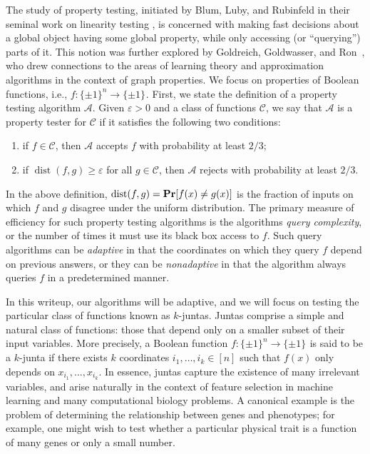 \documentclass[10pt,a4paper]{article}
\newcommand{\say}[1]{``#1''}
\theoremstyle{plain}
\theoremstyle{remark}
\theoremstyle{plain}
\renewcommand{\Pr}{\mathop{\bf Pr\/}}
\newcommand{\calA}{\mathcal{A}}
\newcommand{\calC}{\mathcal{C}}
\newcommand{\dist}{\operatorname{dist}}
\newcommand{\BooleanHypercube}[1]{\{\pm 1\}^{#1}}
\renewcommand{\epsilon}{\varepsilon}
\begin{document}
The study of property testing, initiated by Blum, Luby, and Rubinfeld in their seminal work on linearity testing \cite{DBLP:conf/stoc/BlumLR90}, is concerned with making fast decisions about a global object having some global property, while only accessing (or \say{querying}) parts of it. This notion was further explored by Goldreich, Goldwasser, and Ron~\cite{DBLP:conf/focs/GoldreichGR96}, who drew connections to the areas of learning theory and approximation algorithms in the context of graph properties.
We focus on properties of Boolean functions, i.e.,  $f:\BooleanHypercube{n} \to \BooleanHypercube{}$.
First, we state the definition of a property testing algorithm $\calA$. Given $\epsilon > 0$ and a class of functions $\calC$, we say that $\calA$ is a property tester for $\calC$ if it satisfies the following two conditions: 
\begin{enumerate}
    \item if $f \in \calC$, then $\calA$ accepts $f$ with probability at least $2/3$;
    \item if $\dist(f,g) \geq \epsilon$ for all $g \in \calC$, then $\calA$ rejects with probability at least $2/3$. 
\end{enumerate}
In the above definition, $\dist(f,g) = \Pr[f(x) \neq g(x)]$ is the fraction of inputs on which $f$ and $g$ disagree under the uniform distribution. The primary measure of efficiency for such property testing algorithms is the algorithms \textit{query complexity}, or the number of times it must use its black box access to $f$. Such query algorithms can be \textit{adaptive} in that the coordinates on which they query $f$ depend on previous answers, or they can be \textit{nonadaptive} in that the algorithm always queries $f$ in a predetermined manner. 

%
In this writeup, our algorithms will be adaptive, and we will focus on testing the particular class of functions known as $k$-juntas. Juntas comprise a simple and natural class of functions: those that depend only on a smaller subset of their input variables. More precisely, a  Boolean function $f: \BooleanHypercube{n} \to \BooleanHypercube{}$ is said to be a $k$-junta if there exists $k$ coordinates $i_1,\ldots,i_k\in [n]$ such that $f(x)$ only depends on $x_{i_1},\ldots,x_{i_k}$. In essence, juntas capture the existence of many irrelevant variables, and arise naturally in the context of feature selection in machine learning and many computational biology problems. A canonical example is the problem of determining the relationship between genes and phenotypes; for example, one might wish to test whether a particular physical trait is a function of many genes or only a small number. 
\end{document}
